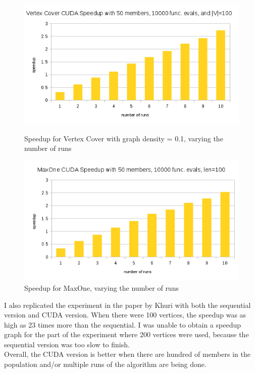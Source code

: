 \documentclass[9pt]{article}
\begin{document}
\begin{figure}[t]
  \centering
  \includegraphics[width=.9\textwidth]{vc_change_runs.png}
  \caption{Speedup for Vertex Cover with graph density = 0.1, varying the number of runs}
  \centering
  \includegraphics[width=.9\textwidth]{maxone_change_runs.png}
  \caption{Speedup for MaxOne, varying the number of runs}
\end{figure}

I also replicated the experiment in the paper by Khuri with both the sequential version and CUDA version. When there were 100 vertices, the speedup was as high as 23 times more than the sequential. I was unable to obtain a speedup graph for the part of the experiment where 200 vertices were used, because the sequential version was too slow to finish.\\

Overall, the CUDA version is better when there are hundred of members in the population and/or multiple runs of the algorithm are being done.
\end{document}
